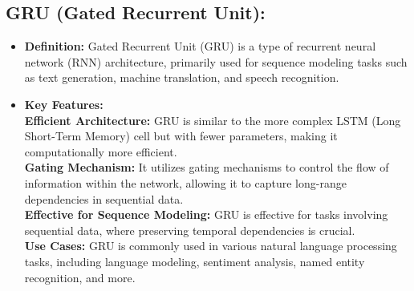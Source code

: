 \documentclass[oneside,a4paper,12pt]{report}
\begin{document}
\subsection{GRU (Gated Recurrent Unit):}
\begin{itemize}


\item{\textbf{Definition:} }Gated Recurrent Unit (GRU) is a type of recurrent neural network (RNN) architecture, primarily used for sequence modeling tasks such as text generation, machine translation, and speech recognition.
\item{\textbf{Key Features:} }\\
\textbf{Efficient Architecture:} GRU is similar to the more complex LSTM (Long Short-Term Memory) cell but with fewer parameters, making it computationally more efficient.\\
\textbf{Gating Mechanism:} It utilizes gating mechanisms to control the flow of information within the network, allowing it to capture long-range dependencies in sequential data.\\
\textbf{Effective for Sequence Modeling:} GRU is effective for tasks involving sequential data, where preserving temporal dependencies is crucial.\\
\textbf{Use Cases:} GRU is commonly used in various natural language processing tasks, including language modeling, sentiment analysis, named entity recognition, and more.
\end{itemize}
\end{document}
